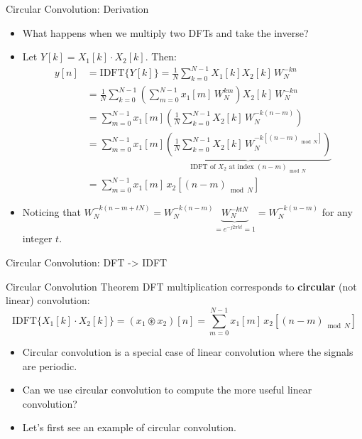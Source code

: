 \begin{frame}{Circular Convolution: Derivation}
    \begin{itemize}
        \item What happens when we multiply two DFTs and take the inverse?
        \item Let $Y[k] = X_1[k] \cdot X_2[k]$. Then:
              {\setlength{\jot}{2pt}
              \begin{align*}
                  y[n] & = \text{IDFT}\{Y[k]\} = \frac{1}{N} \sum_{k=0}^{N-1} X_1[k] X_2[k]\, W_N^{-kn}                                                                                              \\
                       & = \frac{1}{N} \sum_{k=0}^{N-1} \left(\sum_{m=0}^{N-1} x_1[m]\, W_N^{km}\right) X_2[k]\, W_N^{-kn}                                                                           \\
                       & = \sum_{m=0}^{N-1} x_1[m] \left(\frac{1}{N} \sum_{k=0}^{N-1} X_2[k]\, W_N^{-k(n-m)}\right)                                                                                  \\
                       & = \sum_{m=0}^{N-1} x_1[m] \underbrace{\left(\frac{1}{N} \sum_{k=0}^{N-1} X_2[k]\, W_N^{-k[(n-m)_{\bmod N}]}\right)}_{\text{IDFT of } X_2 \text{ at index } (n-m)_{\bmod N}} \\
                       & = \sum_{m=0}^{N-1} x_1[m]\, x_2[(n-m)_{\bmod N}]
              \end{align*}}
        \item Noticing that $W_N^{-k(n-m+tN)} = W_N^{-k(n-m)}\underbrace{W_N^{-ktN}}_{=e^{-j2\pi kt}=1} = W_N^{-k(n-m)}$ for any integer $t$.
    \end{itemize}
\end{frame}

\begin{frame}{Circular Convolution: DFT -> IDFT}
    \begin{conceptbox}{Circular Convolution Theorem}
        DFT multiplication corresponds to \textbf{circular} (not linear) convolution:
        \begin{equation*}
            \text{IDFT}\{X_1[k] \cdot X_2[k]\} = (x_1 \circledast x_2)[n] = \sum_{m=0}^{N-1} x_1[m]\, x_2[(n-m)_{\bmod N}]
        \end{equation*}
    \end{conceptbox}
    \begin{itemize}
        \item Circular convolution is a special case of linear convolution where the signals are periodic.
        \item Can we use circular convolution to compute the more useful linear convolution?
        \item Let's first see an example of circular convolution.
    \end{itemize}
\end{frame}

